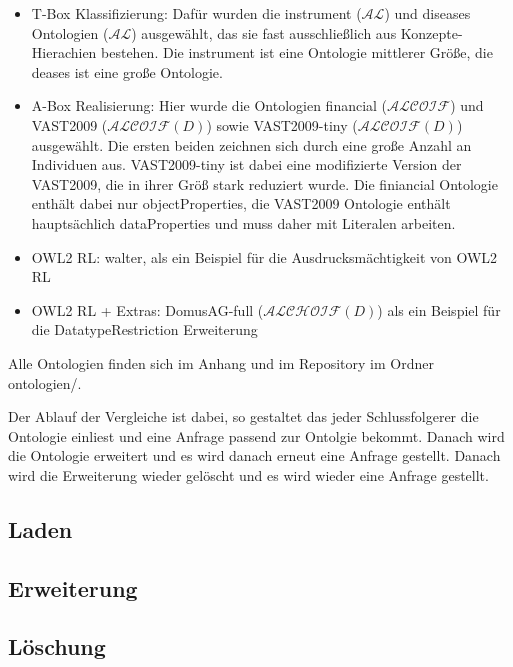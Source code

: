 \begin{itemize}
  \item T-Box Klassifizierung: Dafür wurden die instrument ($\mathcal{AL}$) und diseases Ontologien ($\mathcal{AL}$) ausgewählt, das sie fast ausschließlich aus Konzepte-Hierachien bestehen. Die instrument ist eine Ontologie mittlerer Größe, die deases ist eine große Ontologie.
  \item A-Box Realisierung: Hier wurde die Ontologien financial ($\mathcal{ALCOIF}$) und VAST2009 ($\mathcal{ALCOIF}(D)$) sowie VAST2009-tiny ($\mathcal{ALCOIF}(D)$) ausgewählt. Die ersten beiden zeichnen sich durch eine große Anzahl an Individuen aus. VAST2009-tiny ist dabei eine modifizierte Version der VAST2009, die in ihrer Größ stark reduziert wurde. Die finiancial Ontologie enthält dabei nur objectProperties, die VAST2009 Ontologie enthält hauptsächlich dataProperties und muss daher mit Literalen arbeiten.
  \item OWL2 RL: walter, als ein Beispiel für die Ausdrucksmächtigkeit von OWL2 RL
  \item OWL2 RL + Extras: DomusAG-full ($\mathcal{ALCHOIF}(D)$) als ein Beispiel für die DatatypeRestriction Erweiterung
\end{itemize}

Alle Ontologien finden sich im Anhang und im Repository im Ordner ontologien/.

Der Ablauf der Vergleiche ist dabei, so gestaltet das jeder Schlussfolgerer die Ontologie einliest und eine Anfrage passend zur Ontolgie bekommt. Danach wird die Ontologie erweitert und es wird danach erneut eine Anfrage gestellt. Danach wird die Erweiterung wieder gelöscht und es wird wieder eine Anfrage gestellt.

\subsection{Laden}
\subsection{Erweiterung}
\subsection{Löschung}
